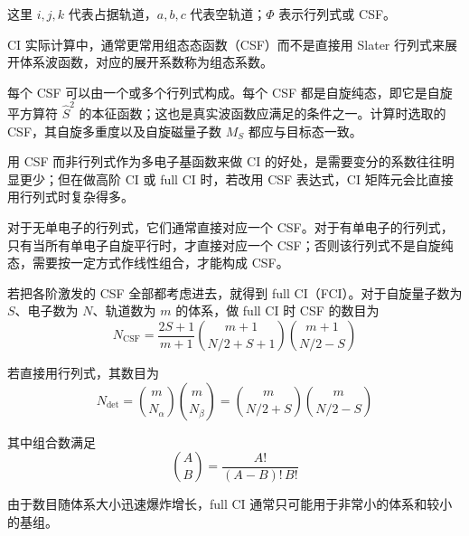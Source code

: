 这里 $i,j,k$ 代表占据轨道，$a,b,c$ 代表空轨道；$\Phi$ 表示行列式或 CSF。

CI 实际计算中，通常更常用组态态函数（CSF）而不是直接用 Slater 行列式来展开体系波函数，对应的展开系数称为组态系数。

每个 CSF 可以由一个或多个行列式构成。每个 CSF 都是自旋纯态，即它是自旋平方算符 $\hat S^2$ 的本征函数；这也是真实波函数应满足的条件之一。计算时选取的 CSF，其自旋多重度以及自旋磁量子数 $M_S$ 都应与目标态一致。

用 CSF 而非行列式作为多电子基函数来做 CI 的好处，是需要变分的系数往往明显更少；但在做高阶 CI 或 full CI 时，若改用 CSF 表达式，CI 矩阵元会比直接用行列式时复杂得多。

对于无单电子的行列式，它们通常直接对应一个 CSF。对于有单电子的行列式，只有当所有单电子自旋平行时，才直接对应一个 CSF；否则该行列式不是自旋纯态，需要按一定方式作线性组合，才能构成 CSF。

\begin{center}
\end{center}

若把各阶激发的 CSF 全部都考虑进去，就得到 full CI（FCI）。对于自旋量子数为 $S$、电子数为 $N$、轨道数为 $m$ 的体系，做 full CI 时 CSF 的数目为
\[
N_{\mathrm{CSF}}
=
\frac{2S+1}{m+1}
\binom{m+1}{N/2+S+1}
\binom{m+1}{N/2-S}
\]

若直接用行列式，其数目为
\[
N_{\mathrm{det}}
=
\binom{m}{N_\alpha}\binom{m}{N_\beta}
=
\binom{m}{N/2+S}\binom{m}{N/2-S}
\]

其中组合数满足
\[
\binom{A}{B}=\frac{A!}{(A-B)!\,B!}
\]

由于数目随体系大小迅速爆炸增长，full CI 通常只可能用于非常小的体系和较小的基组。

